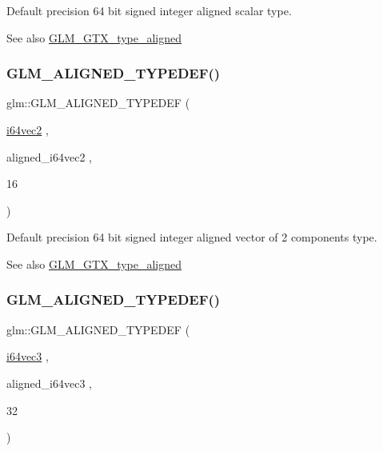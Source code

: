 Default precision 64 bit signed integer aligned scalar type. \begin{DoxySeeAlso}{See also}
\mbox{\hyperlink{group__gtx__type__aligned}{G\+L\+M\+\_\+\+G\+T\+X\+\_\+type\+\_\+aligned}} 
\end{DoxySeeAlso}
\mbox{\label{group__gtx__type__aligned_ga1f9e9c2ea2768675dff9bae5cde2d829}} 
\subsubsection{\texorpdfstring{GLM\_ALIGNED\_TYPEDEF()}{GLM\_ALIGNED\_TYPEDEF()}\hspace{0.1cm}{\footnotesize\ttfamily [66/209]}}
{\footnotesize\ttfamily glm\+::\+G\+L\+M\+\_\+\+A\+L\+I\+G\+N\+E\+D\+\_\+\+T\+Y\+P\+E\+D\+EF (\begin{DoxyParamCaption}\item[{\mbox{\hyperlink{group__gtc__type__precision_ga5a03cb457be28a9a8b9e61163fe648a1}{i64vec2}}}]{,  }\item[{aligned\+\_\+i64vec2}]{,  }\item[{16}]{ }\end{DoxyParamCaption})}

Default precision 64 bit signed integer aligned vector of 2 components type. \begin{DoxySeeAlso}{See also}
\mbox{\hyperlink{group__gtx__type__aligned}{G\+L\+M\+\_\+\+G\+T\+X\+\_\+type\+\_\+aligned}} 
\end{DoxySeeAlso}
\mbox{\label{group__gtx__type__aligned_gad77c317b7d942322cd5be4c8127b3187}} 
\subsubsection{\texorpdfstring{GLM\_ALIGNED\_TYPEDEF()}{GLM\_ALIGNED\_TYPEDEF()}\hspace{0.1cm}{\footnotesize\ttfamily [67/209]}}
{\footnotesize\ttfamily glm\+::\+G\+L\+M\+\_\+\+A\+L\+I\+G\+N\+E\+D\+\_\+\+T\+Y\+P\+E\+D\+EF (\begin{DoxyParamCaption}\item[{\mbox{\hyperlink{group__gtc__type__precision_ga189eb8d6a197bc491cabb6e1f120ecf4}{i64vec3}}}]{,  }\item[{aligned\+\_\+i64vec3}]{,  }\item[{32}]{ }\end{DoxyParamCaption})}

